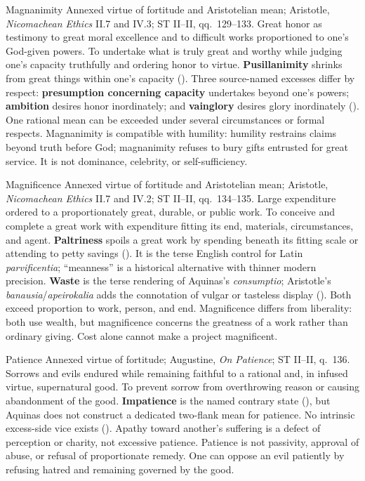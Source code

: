 
\virtuedossier
  {Magnanimity}
  {Annexed virtue of fortitude and Aristotelian mean; Aristotle, \emph{Nicomachean Ethics} II.7 and IV.3; ST II--II, qq.~129--133.}
  {Great honor as testimony to great moral excellence and to difficult works proportioned to one's God-given powers.}
  {To undertake what is truly great and worthy while judging one's capacity truthfully and ordering honor to virtue.}
  {\textbf{Pusillanimity} shrinks from great things within one's capacity ().}
  {Three source-named excesses differ by respect: \textbf{presumption concerning capacity} undertakes beyond one's powers; \textbf{ambition} desires honor inordinately; and \textbf{vainglory} desires glory inordinately ().}
  {One rational mean can be exceeded under several circumstances or formal respects. Magnanimity is compatible with humility: humility restrains claims beyond truth before God; magnanimity refuses to bury gifts entrusted for great service. It is not dominance, celebrity, or self-sufficiency.}

\virtuedossier
  {Magnificence}
  {Annexed virtue of fortitude and Aristotelian mean; Aristotle, \emph{Nicomachean Ethics} II.7 and IV.2; ST II--II, qq.~134--135.}
  {Large expenditure ordered to a proportionately great, durable, or public work.}
  {To conceive and complete a great work with expenditure fitting its end, materials, circumstances, and agent.}
  {\textbf{Paltriness} spoils a great work by spending beneath its fitting scale or attending to petty savings (). It is the terse English control for Latin \emph{parvificentia}; “meanness” is a historical alternative with thinner modern precision.}
  {\textbf{Waste} is the terse rendering of Aquinas's \emph{consumptio}; Aristotle's \emph{banausia}/\emph{apeirokalia} adds the connotation of vulgar or tasteless display (). Both exceed proportion to work, person, and end.}
  {Magnificence differs from liberality: both use wealth, but magnificence concerns the greatness of a work rather than ordinary giving. Cost alone cannot make a project magnificent.}


\virtuedossier
  {Patience}
  {Annexed virtue of fortitude; Augustine, \emph{On Patience}; ST II--II, q.~136.}
  {Sorrows and evils endured while remaining faithful to a rational and, in infused virtue, supernatural good.}
  {To prevent sorrow from overthrowing reason or causing abandonment of the good.}
  {\textbf{Impatience} is the named contrary state (), but Aquinas does not construct a dedicated two-flank mean for patience.}
  {No intrinsic excess-side vice exists (). Apathy toward another's suffering is a defect of perception or charity, not excessive patience.}
  {Patience is not passivity, approval of abuse, or refusal of proportionate remedy. One can oppose an evil patiently by refusing hatred and remaining governed by the good.}

